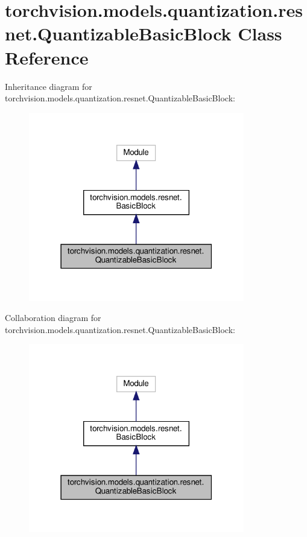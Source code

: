 \hypertarget{classtorchvision_1_1models_1_1quantization_1_1resnet_1_1QuantizableBasicBlock}{}\section{torchvision.\+models.\+quantization.\+resnet.\+Quantizable\+Basic\+Block Class Reference}
\label{classtorchvision_1_1models_1_1quantization_1_1resnet_1_1QuantizableBasicBlock}


Inheritance diagram for torchvision.\+models.\+quantization.\+resnet.\+Quantizable\+Basic\+Block\+:
\nopagebreak
\begin{figure}[H]
\begin{center}
\leavevmode
\includegraphics[width=267pt]{classtorchvision_1_1models_1_1quantization_1_1resnet_1_1QuantizableBasicBlock__inherit__graph}
\end{center}
\end{figure}


Collaboration diagram for torchvision.\+models.\+quantization.\+resnet.\+Quantizable\+Basic\+Block\+:
\nopagebreak
\begin{figure}[H]
\begin{center}
\leavevmode
\includegraphics[width=267pt]{classtorchvision_1_1models_1_1quantization_1_1resnet_1_1QuantizableBasicBlock__coll__graph}
\end{center}
\end{figure}
